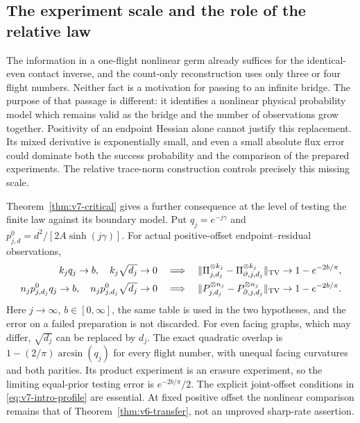 \subsection{The experiment scale and the role of the relative law}
The information in a one-flight nonlinear germ already suffices for
the identical-even contact inverse, and the count-only reconstruction
uses only three or four flight numbers. Neither fact is a motivation
for passing to an infinite bridge. The purpose of that passage is
different: it identifies a nonlinear physical probability model which
remains valid as the bridge and the number of observations grow
together. Positivity of an endpoint Hessian alone cannot justify this
replacement. Its mixed derivative is exponentially small, and even a
small absolute flux error could dominate both the success probability
and the comparison of the prepared experiments. The relative
trace-norm construction controls precisely this missing scale.

Theorem~\ref{thm:v7-critical} gives a further consequence at the level
of testing the finite law against its boundary model. Put
$q_j=e^{-j\gamma}$ and $p_{j,d}^0=d^2/[2A\sinh(j\gamma)]$.
For actual positive-offset endpoint--residual observations,
\begin{equation}\label{eq:v7-intro-profile}
 \begin{split}
 k_jq_j\to b,\quad k_j\sqrt{d_j}\to0
 &\quad\Longrightarrow\quad
 \|\Pi_{j,d_j}^{\otimes k_j}-
       \Pi_{\partial,j,d_j}^{\otimes k_j}\|_{\rm TV}
                 \to1-e^{-2b/\pi},\\
 n_jp_{j,d_j}^0q_j\to b,\quad n_jp_{j,d_j}^0\sqrt{d_j}\to0
 &\quad\Longrightarrow\quad
 \|P_{j,d_j}^{\otimes n_j}-
       P_{\partial,j,d_j}^{\otimes n_j}\|_{\rm TV}
                 \to1-e^{-2b/\pi}.
 \end{split}
\end{equation}
Here $j\to\infty$, $b\in[0,\infty]$, the same table is used in the
two hypotheses, and the error on a failed preparation is not discarded.
For even facing graphs, which may differ, $\sqrt{d_j}$ can be replaced
by $d_j$. The exact quadratic overlap is
$1-(2/\pi)\arcsin(q_j)$ for every flight number, with unequal facing
curvatures and both parities. Its product experiment is an erasure
experiment, so the limiting equal-prior testing error is
$e^{-2b/\pi}/2$. The explicit joint-offset conditions in
\eqref{eq:v7-intro-profile} are essential. At fixed positive offset
the nonlinear comparison remains that of
Theorem~\ref{thm:v6-transfer}, not an unproved sharp-rate assertion.

